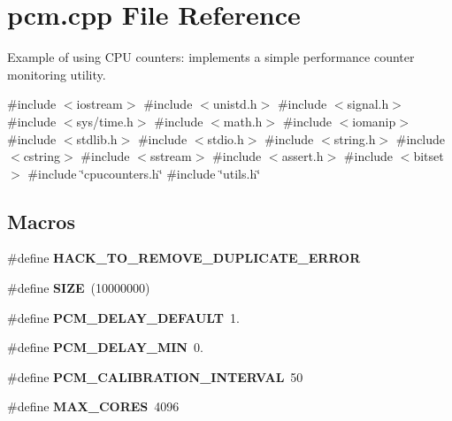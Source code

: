 \section{pcm.\+cpp File Reference}
\label{pcm_8cpp}


Example of using C\+PU counters\+: implements a simple performance counter monitoring utility.  


{\ttfamily \#include $<$iostream$>$}\newline
{\ttfamily \#include $<$unistd.\+h$>$}\newline
{\ttfamily \#include $<$signal.\+h$>$}\newline
{\ttfamily \#include $<$sys/time.\+h$>$}\newline
{\ttfamily \#include $<$math.\+h$>$}\newline
{\ttfamily \#include $<$iomanip$>$}\newline
{\ttfamily \#include $<$stdlib.\+h$>$}\newline
{\ttfamily \#include $<$stdio.\+h$>$}\newline
{\ttfamily \#include $<$string.\+h$>$}\newline
{\ttfamily \#include $<$cstring$>$}\newline
{\ttfamily \#include $<$sstream$>$}\newline
{\ttfamily \#include $<$assert.\+h$>$}\newline
{\ttfamily \#include $<$bitset$>$}\newline
{\ttfamily \#include \char`\"{}cpucounters.\+h\char`\"{}}\newline
{\ttfamily \#include \char`\"{}utils.\+h\char`\"{}}\newline
\subsection*{Macros}
\begin{DoxyCompactItemize}
\item 
\mbox{\label{pcm_8cpp_ac4eeb11d89b0f517835a12a04443ebe4}} 
\#define {\bfseries H\+A\+C\+K\+\_\+\+T\+O\+\_\+\+R\+E\+M\+O\+V\+E\+\_\+\+D\+U\+P\+L\+I\+C\+A\+T\+E\+\_\+\+E\+R\+R\+OR}
\item 
\mbox{\label{pcm_8cpp_a70ed59adcb4159ac551058053e649640}} 
\#define {\bfseries S\+I\+ZE}~(10000000)
\item 
\mbox{\label{pcm_8cpp_aa9ecc55c90c7a69729babc4f5f91ed96}} 
\#define {\bfseries P\+C\+M\+\_\+\+D\+E\+L\+A\+Y\+\_\+\+D\+E\+F\+A\+U\+LT}~1.
\item 
\mbox{\label{pcm_8cpp_acccbe8441d6dd75bdc949f5f0ee126c5}} 
\#define {\bfseries P\+C\+M\+\_\+\+D\+E\+L\+A\+Y\+\_\+\+M\+IN}~0.
\item 
\mbox{\label{pcm_8cpp_a433dde946b6713059756318598c9a6fe}} 
\#define {\bfseries P\+C\+M\+\_\+\+C\+A\+L\+I\+B\+R\+A\+T\+I\+O\+N\+\_\+\+I\+N\+T\+E\+R\+V\+AL}~50
\item 
\mbox{\label{pcm_8cpp_a009855593b59738d24dbfc236edb3b14}} 
\#define {\bfseries M\+A\+X\+\_\+\+C\+O\+R\+ES}~4096
\end{DoxyCompactItemize}
